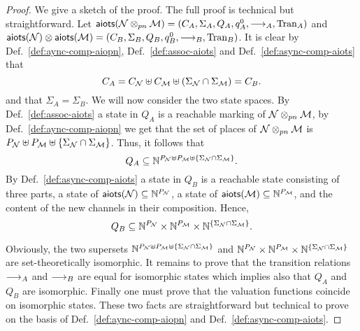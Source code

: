 \begin{proof}
    We give a sketch of the proof. The full proof is technical but straightforward.
Let $\mathsf{aiots}(\mathcal{N} \otimes_{pn} \mathcal{M})=  (C_{A},\allowbreak \Sigma_{A},\allowbreak Q_{A}, \allowbreak q^0_{A}, \allowbreak \stackrel{}{\longrightarrow}_{A}, \allowbreak \mathrm{Tran}_{A})$ and $\mathsf{aiots}(\mathcal{N}) \otimes \mathsf{aiots}(\mathcal{M}) =  (C_{B},\allowbreak \Sigma_{B},\allowbreak Q_{B}, \allowbreak q^0_{B}, \allowbreak \stackrel{}{\longrightarrow}_{B}, \allowbreak \mathrm{Tran}_{B})$. 
     It is clear by Def.~\ref{def:aync-comp-aiopn}, Def.~\ref{def:assoc-aiots} and Def.~\ref{def:async-comp-aiots} that 
     \[
     C_A = C_\mathcal{N} \uplus C_\mathcal{M} \uplus (\Sigma_\mathcal{N} \cap \Sigma_\mathcal{M}) = C_B.
     \]
     and that $\Sigma_A = \Sigma_B$.
     We will now consider the two state spaces. By Def.~\ref{def:assoc-aiots} a state in $Q_A$ is a reachable marking of $\mathcal{N} \otimes_{pn} \mathcal{M}$, by Def.~\ref{def:aync-comp-aiopn} we get that the set of places of $\mathcal{N} \otimes_{pn} \mathcal{M}$ is $P_\mathcal{N} \uplus P_\mathcal{M} \uplus \{\Sigma_\mathcal{N} \cap \Sigma_\mathcal{M}\}$. Thus, it follows that
     \[
        Q_A \subseteq \mathbb{N}^{P_\mathcal{N} \uplus P_\mathcal{M} \uplus \{\Sigma_\mathcal{N} \cap \Sigma_\mathcal{M}\}}.
     \]
     By Def.~\ref{def:async-comp-aiots} a state in $Q_B$ is a reachable state consisting of three parts, a state of $\mathsf{aiots}(\mathcal{N}) \subseteq \mathbb{N}^{P_\mathcal{N}}$, a state of $\mathsf{aiots}(\mathcal{M}) \subseteq \mathbb{N}^{P_\mathcal{M}}$, and the content of the new channels in their composition. Hence, 
     \[
        Q_B \subseteq \mathbb{N}^{P_\mathcal{N}} \times \mathbb{N}^{P_\mathcal{M}} \times \mathbb{N}^{\{\Sigma_\mathcal{N} \cap \Sigma_\mathcal{M}\}}.
     \]
   
Obviously, the two supersets $\mathbb{N}^{P_\mathcal{N} \uplus P_\mathcal{M} \uplus \{\Sigma_\mathcal{N} \cap \Sigma_\mathcal{M}\}}$ and
$\mathbb{N}^{P_\mathcal{N}} \times \mathbb{N}^{P_\mathcal{M}} \times \mathbb{N}^{\{\Sigma_\mathcal{N} \cap \Sigma_\mathcal{M}\}}$
are set-theoretically isomorphic.   
It remains to prove that the transition relations $\stackrel{}{\longrightarrow}_A$ and $\stackrel{}{\longrightarrow}_B$ are equal for isomorphic states which implies
also that $Q_A$ and  $Q_B$ are isomorphic.
Finally one must prove that the valuation functions coincide on isomorphic states. These two facts are straightforward but technical to prove on the basis of Def.~\ref{def:aync-comp-aiopn} and Def.~\ref{def:async-comp-aiots}.
\end{proof}
